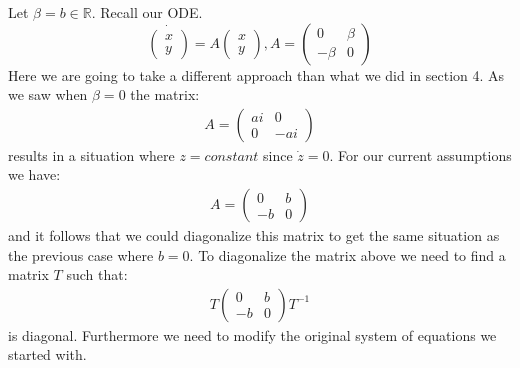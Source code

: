 \documentclass[10pt]{article}
\begin{document}
Let $\beta=b\in\mathbb R$.
Recall our ODE.
$$\dot{\begin{pmatrix}x\\y\end{pmatrix}}=A{\begin{pmatrix}x\\y\end{pmatrix}}, A=\begin{pmatrix}0&\beta\\-\beta&0\end{pmatrix}$$
Here we are going to take a different approach than what we did in section 4. As we saw when $\beta=0$ the matrix:
\begin{align*}
A = \begin{pmatrix}ai&0\\0&-ai\end{pmatrix}
\end{align*}
results in a situation where $z = constant$ since $\dot z = 0$. For our current assumptions we have:
\begin{align*}
A = \begin{pmatrix}0&b\\-b&0\end{pmatrix}
\end{align*}
and it follows that we could diagonalize this matrix to get the same situation as the previous case where $b = 0$. To diagonalize the matrix above we need to find a matrix $T$ such that:
\begin{align*}
T\begin{pmatrix}0&b\\-b&0\end{pmatrix}T^{-1}
\end{align*}
is diagonal. Furthermore we need to modify the original system of equations we started with.
\end{document}
